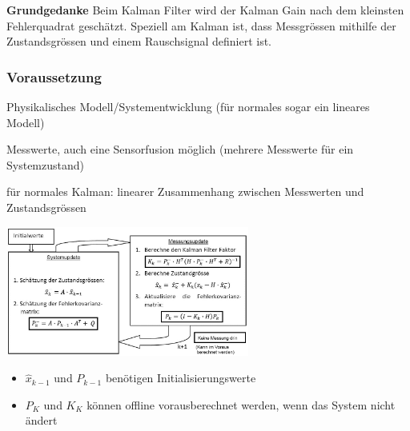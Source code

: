 \textbf{Grundgedanke} Beim Kalman Filter wird der Kalman Gain nach dem
kleinsten Fehlerquadrat geschätzt. Speziell am Kalman ist, dass Messgrössen
mithilfe der Zustandsgrössen und einem Rauschsignal definiert ist. \\
\subsubsection{Voraussetzung}
\begin{aufzaehlung}
   	\item Physikalisches Modell/Systementwicklung (für normales sogar ein
   	lineares Modell)
   	\item Messwerte, auch eine Sensorfusion möglich (mehrere Messwerte für ein
   	Systemzustand)
   	\item für normales Kalman: linearer Zusammenhang zwischen Messwerten und
   	Zustandsgrössen
\end{aufzaehlung}
\begin{minipage}{8cm}
	\includegraphics[width=8cm]{Content/AdaptSigVer/KalmanFilter.jpg}
	
	\begin{itemize}
		\item $\hat{x}_{k-1}$ und $P_{k-1}$ benötigen Initialisierungswerte
		\item $P_K$ und $K_K$ können offline vorausberechnet werden, wenn das System nicht ändert
	\end{itemize}
	
\end{minipage}
